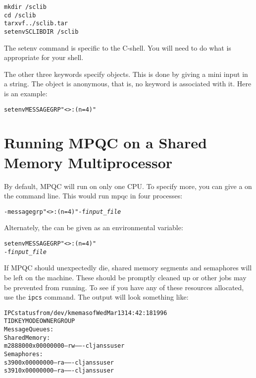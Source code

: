 \begin{alltt}
mkdir ~/sclib
cd ~/sclib
tar xvf ../sclib.tar
setenv SCLIBDIR ~/sclib
\end{alltt}

The setenv command is specific to the C-shell.  You will need to
do what is appropriate for your shell.

The other three keywords specify objects.  This is done by
giving a mini  input in a string.  The
object is anonymous, that is, no keyword is associated with it.
Here is an example:

\begin{alltt}
setenv MESSAGEGRP "<>:(n = 4)"
\end{alltt}

\section{Running MPQC on a Shared Memory Multiprocessor}

By default, MPQC will run on only one CPU.  To specify more, you can give a
  on the command line.
This would run mpqc in four processes:
\begin{alltt}
 {\ttfamily -messagegrp "<>:(n = 4)" -f} {\itshape input_file}
\end{alltt}

Alternately, the   can
be given as an environmental variable:
\begin{alltt}
{\ttfamily setenv MESSAGEGRP "<>:(n = 4)"}
 {\ttfamily -f} {\itshape input_file}
\end{alltt}

If MPQC should unexpectedly die, shared memory segments and
semaphores will be left on the machine.  These should be promptly
cleaned up or other jobs may be prevented from running.  To
see if you have any of these resources allocated, use the
\verb|ipcs| command.  The output will look something
like:

\begin{alltt}
IPC status from /dev/kmem as of Wed Mar 13 14:42:18 1996
T     ID     KEY        MODE       OWNER    GROUP
Message Queues:
Shared Memory:
m 288800 0x00000000 --rw-------  cljanss     user
Semaphores:
s    390 0x00000000 --ra-------  cljanss     user
s    391 0x00000000 --ra-------  cljanss     user
\end{alltt}

